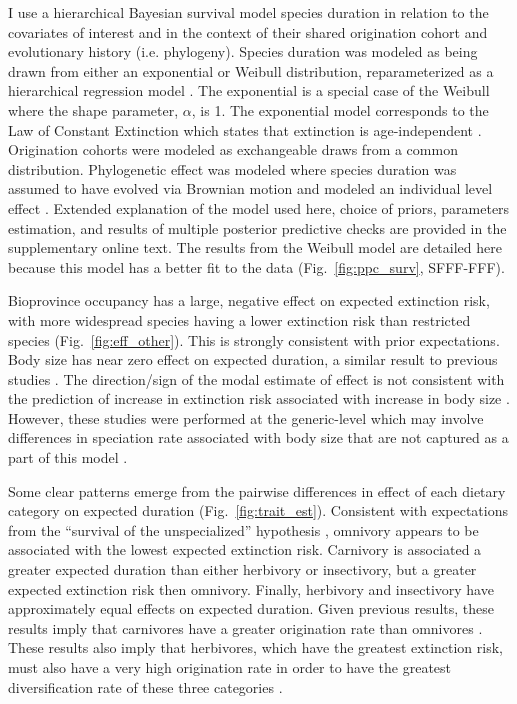 \documentclass[12pt]{article}
\begin{document}
I use a hierarchical Bayesian survival model species duration in relation to the covariates of interest and in the context of their shared origination cohort and evolutionary history (i.e. phylogeny). Species duration was modeled as being drawn from either an exponential or Weibull distribution, reparameterized as a hierarchical regression model \cite{Gelman2013d}. The exponential is a special case of the Weibull where the shape parameter, $\alpha$, is 1. The exponential model corresponds to the Law of Constant Extinction which states that extinction is age-independent \cite{VanValen1973}. Origination cohorts were modeled as exchangeable draws from a common distribution. Phylogenetic effect was modeled where species duration was assumed to have evolved via Brownian motion and modeled an individual level effect \cite{Housworth2004}. Extended explanation of the model used here, choice of priors, parameters estimation, and results of multiple posterior predictive checks are provided in the supplementary online text. The results from the Weibull model are detailed here because this model has a better fit to the data (Fig.~\ref{fig:ppc_surv}, SFFF-FFF).

Bioprovince occupancy has a large, negative effect on expected extinction risk, with more widespread species having a lower extinction risk than restricted species (Fig.~\ref{fig:eff_other}). This is strongly consistent with prior expectations. Body size has near zero effect on expected duration, a similar result to previous studies \cite{Tomiya2013}. The direction/sign of the modal estimate of effect is not consistent with the prediction of increase in extinction risk associated with increase in body size \cite{Liow2008}. However, these studies were performed at the generic-level which may involve differences in speciation rate associated with body size that are not captured as a part of this model \cite{Tomiya2013,Liow2008}.

Some clear patterns emerge from the pairwise differences in effect of each dietary category on expected duration (Fig.~\ref{fig:trait_est}). Consistent with expectations from the ``survival of the unspecialized'' hypothesis \cite{Liow2004a,Simpson1944}, omnivory appears to be associated with the lowest expected extinction risk. Carnivory is associated a greater expected duration than either herbivory or insectivory, but a greater expected extinction risk then omnivory. Finally, herbivory and insectivory have approximately equal effects on expected duration. Given previous results, these results imply that carnivores have a greater origination rate than omnivores \cite{Price2012}. These results also imply that herbivores, which have the greatest extinction risk, must also have a very high origination rate in order to have the greatest diversification rate of these three categories \cite{Price2012}. 
\end{document}
